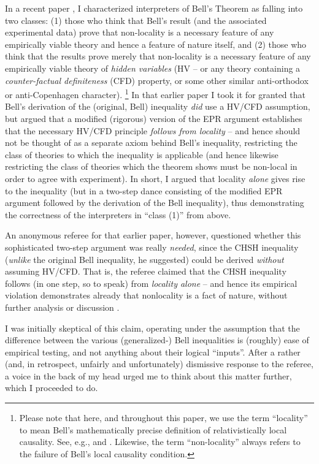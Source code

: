 \documentclass[aps,prc,onecolumn,12pt]{revtex4-2}
\begin{document}
In a recent paper \cite{nonlocchar},
I characterized interpreters of Bell's Theorem
\cite{bell} as falling into two classes:  (1) those who think that
Bell's result (and the associated experimental data) prove that
non-locality is a necessary feature of any empirically viable theory
and hence a feature of nature itself, and (2) those who think that the
results prove merely that non-locality is a necessary feature of any
empirically viable theory of \emph{hidden variables} (HV -- or any theory
containing a \emph{counter-factual definiteness} (CFD) property, or some
other similar anti-orthodox or anti-Copenhagen character).
\footnote{Please note that here, and throughout this paper, we use the
  term ``locality'' to mean Bell's
  mathematically precise definition of relativistically local
  causality.  See, e.g., \cite[pg 232-248, pg 52-62]{bell} and
  \cite{nonlocchar}.  Likewise, the term ``non-locality'' always
  refers to the failure of Bell's local causality condition.}
In that earlier paper I took it for granted that Bell's derivation of
the (original, Bell) inequality \emph{did} use a HV/CFD assumption,
but argued that a modified (rigorous) version of the EPR argument \cite{epr}
establishes that the necessary HV/CFD principle \emph{follows from
  locality} -- and hence should not be thought of as a separate axiom
behind Bell's inequality, restricting the class of theories to which
the inequality is applicable (and hence likewise restricting the class
of theories which the theorem shows must be non-local in order to agree with
experiment).  In short, I argued that locality \emph{alone} gives rise
to the inequality (but in a two-step dance consisting of the modified
EPR argument followed by the derivation of the Bell inequality), thus
demonstrating the correctness of the interpreters in ``class (1)''
from above.

An anonymous referee for that earlier paper, however, questioned
whether this sophisticated two-step argument was really \emph{needed},
since the CHSH \cite{chsh}
inequality (\emph{unlike} the original Bell inequality,
he suggested) could be derived \emph{without} assuming HV/CFD.  That
is, the referee claimed that the CHSH inequality follows (in one step,
so to speak) from \emph{locality alone} -- and hence its empirical
violation demonstrates already that nonlocality is a fact of nature,
without further analysis or discussion \cite{skyrms}.

I was initially skeptical of this claim, operating under the
assumption that the difference between the various (generalized-) Bell
inequalities is (roughly) ease of empirical testing, and not anything
about their logical ``inputs''.  After a rather (and, in retrospect,
unfairly and unfortunately) dismissive response to the referee, a
voice in the back of my head urged me to think about this matter
further, which I proceeded to do.
\end{document}

